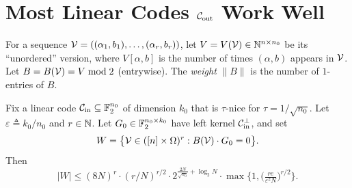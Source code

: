 \chapter{Most Linear Codes \texorpdfstring{$\mathcal{C}_{\mathrm{out}}$}{Cout} Work Well}
\label{chap:most}

\begin{definition}
  \label{def:V-B}
  For a sequence $\mathcal{V} = ((\alpha_1,b_1),\dots,(\alpha_r,b_r))$, let
  $V = V(\mathcal{V}) \in \mathbb{N}^{n \times n_0}$ be its ``unordered'' version, where
  $V[\alpha,b]$ is the number of times $(\alpha,b)$ appears in $\mathcal{V}$. Let
  $B = B(\mathcal{V}) = V \bmod 2$ (entrywise). The \emph{weight} $\|B\|$ is the number
  of $1$-entries of $B$.
\end{definition}

\begin{lemma}
  \label{claim:counting-W}
  Fix a linear code $\mathcal{C}_{\mathrm{in}} \subseteq \mathbb{F}_2^{n_0}$ of dimension $k_0$ that is
  $\tau$-nice for $\tau = 1/\sqrt{n_0}$. Let $\varepsilon \triangleq k_0/n_0$ and
  $r \in \mathbb{N}$. Let $G_0 \in \mathbb{F}_2^{n_0\times k_0}$ have left kernel
  $\mathcal{C}_{\mathrm{in}}^\perp$, and set
  \[
    W = \big\{\mathcal{V} \in ([n]\times\Omega)^r : B(\mathcal{V})\cdot G_0 = 0\big\}.
  \]
  Then
  \[
    |W| \leq (8N)^r \cdot (r/N)^{r/2}\cdot 2^{\frac{2N}{\sqrt{n_0}} + \log_2 N}
      \cdot \max\Big\{1, \Big(\tfrac{re}{\varepsilon^2 N}\Big)^{r/2}\Big\}.
  \]
\end{lemma}

